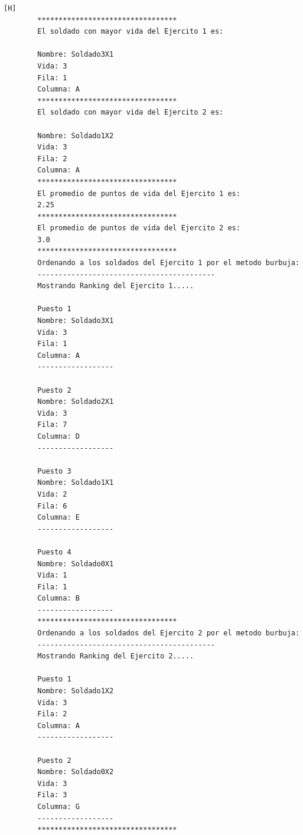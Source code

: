 \documentclass{article}
\begin{document}
\begin{lstlisting}[language=bash,caption={La ejecución: \textcolor{red}{PARA PODER VER LA TABLA COMPLETAMENTE MIRAR LA PLANTILLA DE LATEX O EJECUTARLO: }}][H]
		*********************************
		El soldado con mayor vida del Ejercito 1 es: 
		
		Nombre: Soldado3X1
		Vida: 3
		Fila: 1
		Columna: A
		*********************************
		El soldado con mayor vida del Ejercito 2 es: 
		
		Nombre: Soldado1X2
		Vida: 3
		Fila: 2
		Columna: A
		*********************************
		El promedio de puntos de vida del Ejercito 1 es: 
		2.25
		*********************************
		El promedio de puntos de vida del Ejercito 2 es: 
		3.0
		*********************************
		Ordenando a los soldados del Ejercito 1 por el metodo burbuja: 
		------------------------------------------
		Mostrando Ranking del Ejercito 1.....
		
		Puesto 1
		Nombre: Soldado3X1
		Vida: 3
		Fila: 1
		Columna: A
		------------------
		
		Puesto 2
		Nombre: Soldado2X1
		Vida: 3
		Fila: 7
		Columna: D
		------------------
		
		Puesto 3
		Nombre: Soldado1X1
		Vida: 2
		Fila: 6
		Columna: E
		------------------
		
		Puesto 4
		Nombre: Soldado0X1
		Vida: 1
		Fila: 1
		Columna: B
		------------------
		*********************************
		Ordenando a los soldados del Ejercito 2 por el metodo burbuja: 
		------------------------------------------
		Mostrando Ranking del Ejercito 2.....
		
		Puesto 1
		Nombre: Soldado1X2
		Vida: 3
		Fila: 2
		Columna: A
		------------------
		
		Puesto 2
		Nombre: Soldado0X2
		Vida: 3
		Fila: 3
		Columna: G
		------------------
		*********************************
	\end{lstlisting}
\end{document}
